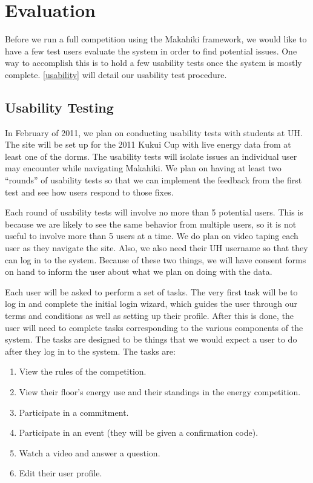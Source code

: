\chapter {Evaluation}
\label{evaluation}

Before we run a full competition using the Makahiki framework, we would like to have a few test users evaluate the system in order to find potential issues.  One way to accomplish this is to hold a few usability tests once the system is mostly complete. \autoref{usability} will detail our usability test procedure.

\section{Usability Testing}
\label{usability}

In February of 2011, we plan on conducting usability tests with students at UH.  The site will be set up for the 2011 Kukui Cup with live energy data from at least one of the dorms.  The usability tests will isolate issues an individual user may encounter while navigating Makahiki.  We plan on having at least two ``rounds'' of usability tests so that we can implement the feedback from the first test and see how users respond to those fixes.

Each round of usability tests will involve no more than 5 potential users.  This is because we are likely to see the same behavior from multiple users, so it is not useful to involve more than 5 users at a time\cite{usability-users}.  We do plan on video taping each user as they navigate the site.  Also, we also need their UH username so that they can log in to the system.  Because of these two things, we will have consent forms on hand to inform the user about what we plan on doing with the data.

Each user will be asked to perform a set of tasks.  The very first task will be to log in and complete the initial login wizard, which guides the user through our terms and conditions as well as setting up their profile.  After this is done, the user will need to complete tasks corresponding to the various components of the system.  The tasks are designed to be things that we would expect a user to do after they log in to the system.  The tasks are:

\begin{enumerate}
  \item View the rules of the competition.
  \item View their floor's energy use and their standings in the energy competition.
  \item Participate in a commitment.
  \item Participate in an event (they will be given a confirmation code).
  \item Watch a video and answer a question.
  \item Edit their user profile.
\end{enumerate}

